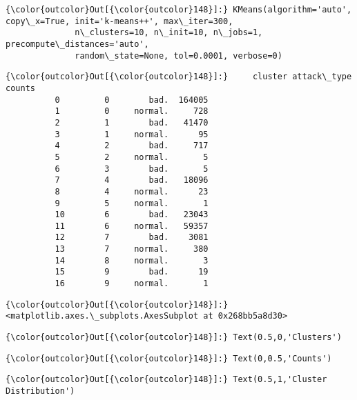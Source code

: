 \documentclass[11pt]{article}
\begin{document}
\begin{Verbatim}[commandchars=\\\{\}]
{\color{outcolor}Out[{\color{outcolor}148}]:} KMeans(algorithm='auto', copy\_x=True, init='k-means++', max\_iter=300,
              n\_clusters=10, n\_init=10, n\_jobs=1, precompute\_distances='auto',
              random\_state=None, tol=0.0001, verbose=0)
\end{Verbatim}
            
\begin{Verbatim}[commandchars=\\\{\}]
{\color{outcolor}Out[{\color{outcolor}148}]:}     cluster attack\_type  counts
          0         0        bad.  164005
          1         0     normal.     728
          2         1        bad.   41470
          3         1     normal.      95
          4         2        bad.     717
          5         2     normal.       5
          6         3        bad.       5
          7         4        bad.   18096
          8         4     normal.      23
          9         5     normal.       1
          10        6        bad.   23043
          11        6     normal.   59357
          12        7        bad.    3081
          13        7     normal.     380
          14        8     normal.       3
          15        9        bad.      19
          16        9     normal.       1
\end{Verbatim}
            
\begin{Verbatim}[commandchars=\\\{\}]
{\color{outcolor}Out[{\color{outcolor}148}]:} <matplotlib.axes.\_subplots.AxesSubplot at 0x268bb5a8d30>
\end{Verbatim}
            
\begin{Verbatim}[commandchars=\\\{\}]
{\color{outcolor}Out[{\color{outcolor}148}]:} Text(0.5,0,'Clusters')
\end{Verbatim}
            
\begin{Verbatim}[commandchars=\\\{\}]
{\color{outcolor}Out[{\color{outcolor}148}]:} Text(0,0.5,'Counts')
\end{Verbatim}
            
\begin{Verbatim}[commandchars=\\\{\}]
{\color{outcolor}Out[{\color{outcolor}148}]:} Text(0.5,1,'Cluster Distribution')
\end{Verbatim}
            
\end{document}
